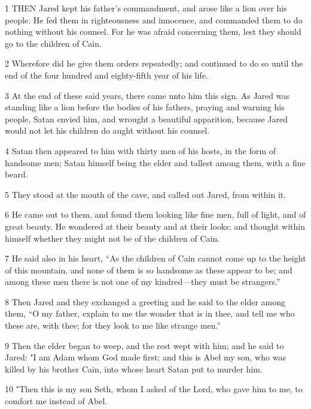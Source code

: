\par 1 THEN Jared kept his father's commandment, and arose like a lion over his people. He fed them in righteousness and innocence, and commanded them to do nothing without his counsel. For he was afraid concerning them, lest they should go to the children of Cain.

\par 2 Wherefore did he give them orders repeatedly; and continued to do so until the end of the four hundred and eighty-fifth year of his life.

\par 3 At the end of these said years, there came unto him this sign. As Jared was standing like a lion before the bodies of his fathers, praying and warning his people, Satan envied him, and wrought a beautiful apparition, because Jared would not let his children do aught without his counsel.

\par 4 Satan then appeared to him with thirty men of his hosts, in the form of handsome men; Satan himself being the elder and tallest among them, with a fine beard.

\par 5 They stood at the mouth of the cave, and called out Jared, from within it.

\par 6 He came out to them, and found them looking like fine men, full of light, and of great beauty. He wondered at their beauty and at their looks; and thought within himself whether they might not be of the children of Cain.

\par 7 He said also in his heart, “As the children of Cain cannot come up to the height of this mountain, and none of them is so handsome as these appear to be; and among these men there is not one of my kindred—they must be strangers.”

\par 8 Then Jared and they exchanged a greeting and he said to the elder among them, “O my father, explain to me the wonder that is in thee, and tell me who these are, with thee; for they look to me like strange men.”

\par 9 Then the elder began to weep, and the rest wept with him; and he said to Jared: "I am Adam whom God made first; and this is Abel my son, who was killed by his brother Cain, into whose heart Satan put to murder him.

\par 10 "Then this is my son Seth, whom I asked of the Lord, who gave him to me, to comfort me instead of Abel.

